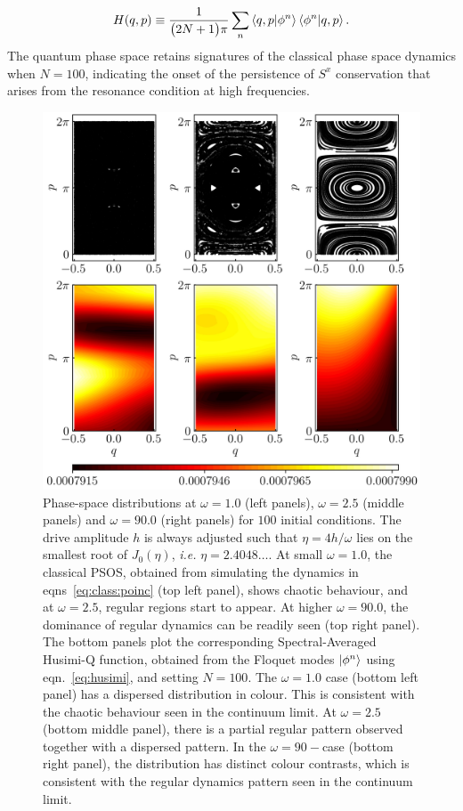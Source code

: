 \documentclass[%
reprint,
superscriptaddress,
linenumbers,
amsmath,amssymb,
aps,
prb,
showkeys,
]{revtex4-2}
\begin{document}
	\begin{equation}
		H(q,p)\equiv \frac{1}{\big(2N+1\big)\pi}\sum_n \ip{q,p}{\phi^n}\ip{\phi^n}{q,p}.
		\label{eq:husimi}
	\end{equation}
	The quantum phase space retains signatures of the classical phase space dynamics when $N=100$, indicating the onset of the persistence of $S^x$ conservation that arises from the resonance condition at high frequencies. 
	\begin{figure}[ht!]
		\centering
		\includegraphics[width = 9.0 cm]{lmg_poincare011.jpeg}
		\caption{Phase-space distributions at $\omega=1.0$ (left panels), $\omega=2.5$ (middle panels) and $\omega=90.0$ (right panels) for $100$ initial conditions. The drive amplitude $h$ is always adjusted such that $\eta=4h/\omega$ lies on the smallest root of $J_0(\eta)$, \textit{i.e.} $\eta=2.4048\dots$. At small $\omega=1.0$, the classical PSOS, obtained from simulating the dynamics in eqns~\ref{eq:class:poinc} (top left panel),  shows chaotic behaviour, and at $\omega = 2.5$, regular regions start to appear. At higher $\omega = 90.0$, the dominance of regular dynamics can be readily seen (top right panel). The bottom panels plot the corresponding Spectral-Averaged Husimi-Q function, obtained from the Floquet modes $\ket{\phi^n}$ using eqn.~\ref{eq:husimi}, and setting $N=100$. The $\omega=1.0$ case (bottom left panel) has a dispersed distribution in colour. This is consistent with the chaotic behaviour seen in the continuum limit. At $\omega = 2.5$ (bottom middle panel), there is a partial regular pattern observed together with a dispersed pattern. In the $\omega=90-$case (bottom right panel), the distribution has distinct colour contrasts, which is consistent with the regular dynamics pattern seen in the continuum limit.}
		\label{fig:classical_lipkin}
	\end{figure}
\end{document}
